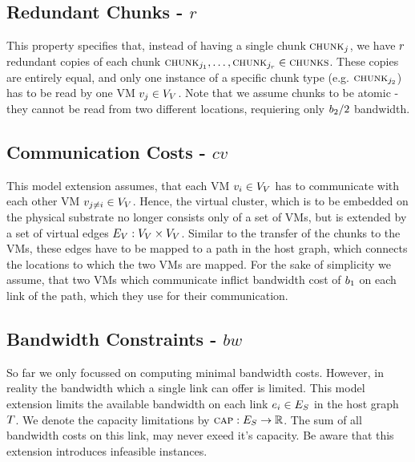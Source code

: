 \subsection{Redundant Chunks - $r$}

This property specifies that, instead of having a single chunk $\textsc{chunk}_j$, we 
have $r$ redundant copies of each chunk 
$\textsc{chunk}_{j_1},\dots,\textsc{chunk}_{j_{r}}  \in \textsc{chunks}$. These copies are 
entirely equal, and only one instance of a specific chunk type (e.g. 
$\textsc{chunk}_{j_2}$) has to be read by one VM $v_j \in V_V$. 
Note that we assume chunks to be atomic - they cannot be read from two different 
locations, requiering only $b_2 / 2$  bandwidth.

\subsection{Communication Costs - $cv$}


This model extension assumes, that each VM  $v_i \in V_V$ 
has to communicate with each other VM $v_{j \neq i} \in 
V_V$. Hence, the virtual cluster, which is to be embedded on the 
physical substrate no longer consists only of a set of VMs, but is extended by a 
set of virtual edges $E_V : V_V \times V_V$. 
Similar to the transfer of the chunks to the VMs, these edges have to be mapped 
to a path in the host graph, which connects the locations to which the two VMs 
are mapped. For the sake of simplicity we assume, that two VMs which communicate 
inflict bandwidth cost of $b_1$ on each link of the path, which they use 
for their communication.

\subsection{Bandwidth Constraints - $bw$}

So far we only focussed on computing minimal bandwidth costs. However, in 
reality the bandwidth which a single link can offer is limited. This model 
extension limits the available bandwidth on each link $e_i \in 
E_S$ in the host graph $T$. We denote the capacity limitations 
by $\textsc{cap} : E_S \rightarrow \mathbb{R}$. The sum of all 
bandwidth costs on this link, may never exeed it's capacity. Be aware that 
this extension introduces infeasible instances.

